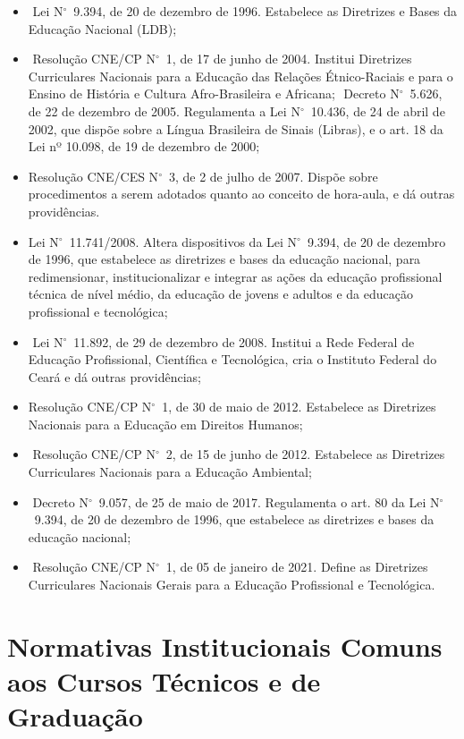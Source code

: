 \documentclass[
	12pt,				%
	openright,			%
	twoside,			%
	a4paper,			%
	chapter=TITLE,		%
	english,			%
	french,				%
	spanish,			%
	brazil,				%
	]{abntex2}
\newcommand{\n}{N$^\circ$}
\begin{document}
\begin{itemize}
   \item  Lei \n~9.394, de 20 de dezembro de 1996. Estabelece as Diretrizes e Bases da Educação Nacional (LDB);
\item Resolução CNE/CP \n~1, de 17 de junho de 2004. Institui Diretrizes Curriculares Nacionais para a Educação das Relações Étnico-Raciais e para o Ensino de História e Cultura Afro-Brasileira e Africana;
 Decreto \n~5.626, de 22 de dezembro de 2005. Regulamenta a Lei \n~10.436, de 24 de abril
de 2002, que dispõe sobre a Língua Brasileira de Sinais (Libras), e o art. 18 da Lei nº 10.098,
de 19 de dezembro de 2000;
\item  Resolução CNE/CES \n~3, de 2 de julho de 2007. Dispõe sobre procedimentos a serem
adotados quanto ao conceito de hora-aula, e dá outras providências.
\item  Lei \n~11.741/2008. Altera dispositivos da Lei \n~9.394, de 20 de dezembro de 1996, que
estabelece as diretrizes e bases da educação nacional, para redimensionar, institucionalizar
e integrar as ações da educação profissional técnica de nível médio, da educação de jovens
e adultos e da educação profissional e tecnológica;
\item  Lei \n~11.892, de 29 de dezembro de 2008. Institui a Rede Federal de Educação Profissional,
Científica e Tecnológica, cria o Instituto Federal do Ceará e dá outras providências;
\item Resolução CNE/CP \n~1, de 30 de maio de 2012. Estabelece as Diretrizes Nacionais para a
Educação em Direitos Humanos;
\item  Resolução CNE/CP \n~2, de 15 de junho de 2012. Estabelece as Diretrizes Curriculares
Nacionais para a Educação Ambiental;
\item  Decreto \n~9.057, de 25 de maio de 2017. Regulamenta o art. 80 da Lei \n~9.394, de 20 de
dezembro de 1996, que estabelece as diretrizes e bases da educação nacional;
\item Resolução CNE/CP \n~1, de 05 de janeiro de 2021. Define as Diretrizes Curriculares Nacionais
Gerais para a Educação Profissional e Tecnológica.
\end{itemize}

\section{Normativas Institucionais Comuns aos Cursos Técnicos e de Graduação}
\end{document}
